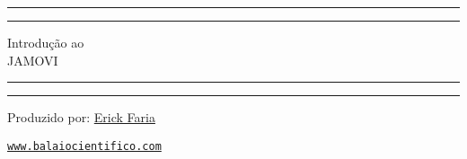 \begin{titlepage}
	\centering %
	\scshape %
	\vspace*{1.5\baselineskip} %

	\rule{13cm}{1.6pt}\vspace*{-\baselineskip}\vspace*{2pt} %
	\rule{13cm}{0.4pt} %
	
		\vspace{0.75\baselineskip} %
	{	\Huge Introdução ao\\ 
			\vspace{4mm}
		JAMOVI \\	}
		\vspace{0.75\baselineskip} %
	\rule{13cm}{0.4pt}\vspace*{-\baselineskip}\vspace{3.2pt} %
	\rule{13cm}{1.6pt} %
	
		\vspace{1.75\baselineskip} %
	{\large Produzido por: \href{https://www.balaiocientifico.com/author/erickfaria/?utm_source=apostila_jamovi&utm_medium=pdf}{Erick Faria} \\
		\vspace*{1.2\baselineskip}}
	\vfill
	
\href{https://www.balaiocientifico.com/?utm_source=apostila_jamovi&utm_medium=pdf}{\texttt{www.balaiocientifico.com}}\\
\vspace{0.5cm}
\ccby
\end{titlepage}